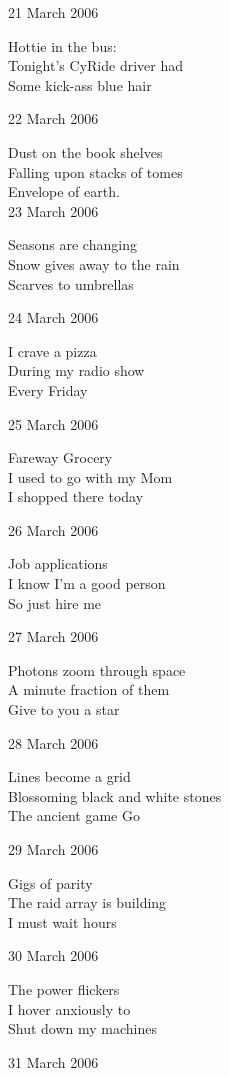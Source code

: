 \documentclass[12pt]{article}
\begin{document}
21 March 2006

Hottie in the bus: \\
Tonight's CyRide driver had \\
Some kick-ass blue hair


22 March 2006

Dust on the book shelves \\
Falling upon stacks of tomes \\
Envelope of earth. \\


23 March 2006

Seasons are changing \\
Snow gives away to the rain \\
Scarves to umbrellas


24 March 2006

I crave a pizza \\
During my radio show \\
Every Friday


25 March 2006

Fareway Grocery \\
I used to go with my Mom \\
I shopped there today


\newpage

26 March 2006

Job applications \\
I know I'm a good person \\
So just hire me


27 March 2006

Photons zoom through space \\
A minute fraction of them \\
Give to you a star


28 March 2006

Lines become a grid \\
Blossoming black and white stones \\
The ancient game Go


29 March 2006

Gigs of parity \\
The raid array is building \\
I must wait hours


30 March 2006

The power flickers \\
I hover anxiously to \\
Shut down my machines


31 March 2006
\end{document}
